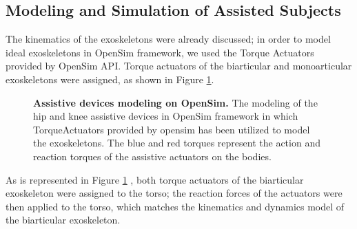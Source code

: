 \documentclass[10pt,letterpaper]{article}
\begin{document}
\subsection*{Modeling and Simulation of Assisted Subjects}
The kinematics of the exoskeletons were already discussed; in order to model ideal exoskeletons in OpenSim framework, we used the Torque Actuators provided by OpenSim API\cite{103}. Torque actuators of the biarticular and monoarticular exoskeletons were assigned, as shown in Figure \ref{Fig_Exos_Model_Opensim}.
\begin{figure}[h!]
	\centering
	\hfil
	\vspace{1mm}
	\caption{\small{\textbf{Assistive devices modeling on OpenSim.} The modeling of the hip and knee assistive devices in OpenSim framework in which TorqueActuators provided by opensim has been utilized to model the exoskeletons. The blue and red torques represent the action and reaction torques of the assistive actuators on the bodies.}}
	\label{Fig_Exos_Model_Opensim}
\end{figure}
As is represented in Figure \ref{Fig_Exos_Model_Opensim} , both torque actuators of the biarticular exoskeleton were assigned to the torso; the reaction forces of the actuators were then applied to the torso, which matches the kinematics and dynamics model of the biarticular exoskeleton.
\end{document}
